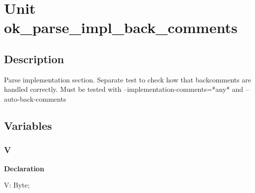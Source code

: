 \documentclass{report}
\newif\ifpdf
\begin{document}
\label{toc}\tableofcontents
\newpage
\newlength{\tmplength}
\chapter{Unit ok{\_}parse{\_}impl{\_}back{\_}comments}
\label{ok_parse_impl_back_comments}
\section{Description}
Parse implementation section. Separate test to check how that backcomments are handled correctly. Must be tested with --implementation{-}comments=*any* and --auto{-}back{-}comments
\section{Variables}
\ifpdf
\subsection*{\large{\textbf{V}}\normalsize\hspace{1ex}\hrulefill}
\else
\subsection*{V}
\fi
\label{ok_parse_impl_back_comments-V}
\begin{list}{}{
\setlength{\itemindent}{0cm}
\setlength{\listparindent}{0cm}
\setlength{\leftmargin}{\evensidemargin}
\addtolength{\leftmargin}{\tmplength}
\settowidth{\labelsep}{X}
\addtolength{\leftmargin}{\labelsep}
\setlength{\labelwidth}{\tmplength}
}
\item[\textbf{Declaration}\hfill]
\ifpdf
\begin{flushleft}
\fi
\begin{ttfamily}
V: Byte;\end{ttfamily}

\ifpdf
\end{flushleft}
\fi

\end{list}
\end{document}
